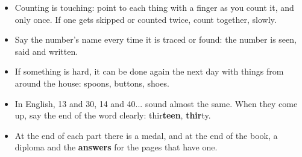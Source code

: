 {\small
\begin{itemize}[leftmargin=6mm, itemsep=1pt, topsep=2pt]
\item Counting is touching: point to each thing with a finger as you
  count it, and only once. If one gets skipped or counted twice, count
  together, slowly.
\item Say the number's name every time it is traced or found: the
  number is seen, said and written.
\item If something is hard, it can be done again the next day with
  things from around the house: spoons, buttons, shoes.
\item In English, 13 and 30, 14 and 40... sound almost the same. When
  they come up, say the end of the word clearly: thir\textbf{teen},
  \textbf{thir}ty.
\item At the end of each part there is a medal, and at the end of the
  book, a diploma and the \textbf{answers} for the pages that have one.
\end{itemize}}
\newpage
